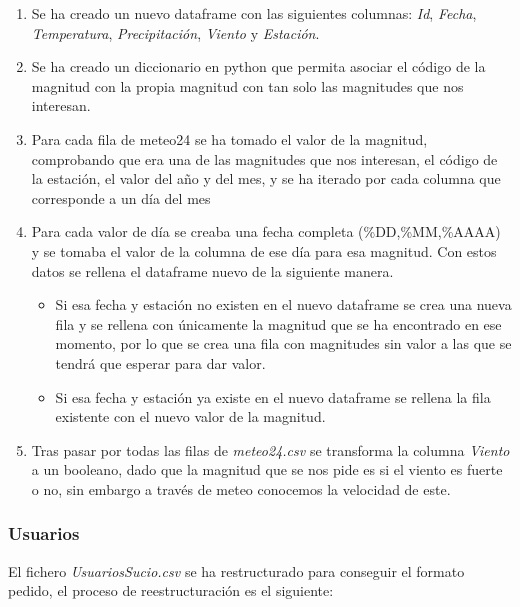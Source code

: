 \documentclass[]{article}
\begin{document}
\begin{enumerate}
    \item Se ha creado un nuevo dataframe con las siguientes columnas: \textit{Id}, \textit{Fecha}, \textit{Temperatura}, \textit{Precipitación}, \textit{Viento} y \textit{Estación}.
    \item Se ha creado un diccionario en python que permita asociar el código de la magnitud con la propia magnitud con tan solo las magnitudes que nos interesan.
    \item Para cada fila de meteo24 se ha tomado el valor de la magnitud, comprobando que era una de las magnitudes que nos interesan, el código de la estación, el valor del año y del mes, y se ha iterado por cada columna que corresponde a un día del mes
    \item Para cada valor de día se creaba una fecha completa (\%DD,\%MM,\%AAAA) y se tomaba el valor de la columna de ese día para esa magnitud. Con estos datos se rellena el dataframe nuevo de la siguiente manera.
    \begin{itemize}
        \item Si esa fecha y estación no existen en el nuevo dataframe se crea una nueva fila y se rellena con únicamente la magnitud que se ha encontrado en ese momento, por lo que se crea una fila con magnitudes sin valor a las que se tendrá que esperar para dar valor.
        \item Si esa fecha y estación ya existe en el nuevo dataframe se rellena la fila existente con el nuevo valor de la magnitud.
    \end{itemize}
    \item Tras pasar por todas las filas de \textit{meteo24.csv} se transforma la columna \textit{Viento} a un booleano, dado que la magnitud que se nos pide es si el viento es fuerte o no, sin embargo a través de meteo conocemos la velocidad de este.
\end{enumerate}

\subsubsection{Usuarios}
\label{subsubsec:preprocessusuarios}
El fichero \textit{UsuariosSucio.csv} se ha restructurado para conseguir el formato pedido, el proceso de reestructuración es el siguiente:
\end{document}
